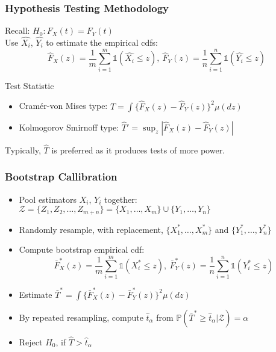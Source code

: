 \documentclass[10pt,dvipsnames,table]{beamer}
\newcommand{\Prob}{\mathds{P}}
\newcommand{\Ind}{\mathds{1}}
\begin{document}
\begin{frame}
\frametitle{Hypothesis Testing Methodology}
Recall: $H_0: F_X(t) = F_Y(t)$ \\
\pause Use $\hat{X_i}$, $\hat{Y_i}$ to estimate the empirical cdfs: 
\[ \hat{F}_X(z) = \frac{1}{m}\sum_{i=1}^{m} \Ind(\hat{X_i} \leq z), \ \hat{F}_Y(z) = \frac{1}{n}\sum_{i=1}^{n} \Ind(\hat{Y_i} \leq z)\]
\pause
\begin{block}{Test Statistic}
\begin{itemize}
\item Cram\'{e}r-von Mises type: $\hat{T} = \int \{\hat{F}_X(z) - \hat{F}_Y(z) \}^2 \mu(dz)$ 
\item Kolmogorov Smirnoff type: $\hat{T}' = \sup_z|\hat{F}_X(z) - \hat{F}_Y(z)|$
\end{itemize}
Typically, $\hat{T}$ is preferred as it produces tests of more power.
\end{block}
\end{frame}

\begin{frame}
\frametitle{Bootstrap Callibration}
\begin{itemize}
\item Pool estimators $X_i$, $Y_i$ together: $\mathcal{Z} = \{Z_1, Z_2, \dots, Z_{m+n} \} = \{X_1,\dots, X_m \} \cup \{Y_1,\dots, Y_n \}$
\item Randomly resample, with replacement, $\{X_1^*,\dots, X_m^* \}$ and $\{Y_1^*,\dots, Y_n^* \}$
\item Compute bootstrap empirical cdf: \[\bar{F}^*_X(z) = \frac{1}{m}\sum_{i=1}^{m} \Ind(X^*_i \leq z), \ \bar{F}^*_Y(z) = \frac{1}{n}\sum_{i=1}^{n} \Ind(Y_i^* \leq z)\]
\item Estimate $\bar{T}^* = \int \{\bar{F}^*_X(z) - \bar{F}^*_Y(z) \}^2 \mu(dz)$
\item By repeated resampling, compute $\hat{t}_{\alpha}$ from $\Prob(\bar{T}^* \geq \hat{t}_{\alpha} | \mathcal{Z}) = \alpha$
\item Reject $H_0$, if $\hat{T} > \hat{t}_{\alpha}$
\end{itemize}
\end{frame}
\end{document}
